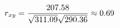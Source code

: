 \documentclass[preview]{standalone}
\begin{document}
\begin{align*}
\special{dvisvgm:raw <g id='unique000'>}r_{xy}=\frac{207.58}{\sqrt{311.09}\sqrt{290.36}}\approx 0.69\special{dvisvgm:raw </g>}
\end{align*}
\end{document}
